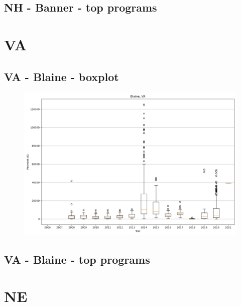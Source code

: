 \subsection*{NH - Banner - top programs}

\newpage
\section*{VA}
\subsection*{VA - Blaine - boxplot}
\begin{figure}[h]
\centering
\includegraphics[width=7in]{../output/boxplots/counties/Blaine-VA_boxplot.png}
\end{figure}


\subsection*{VA - Blaine - top programs}

\newpage
\section*{NE}
